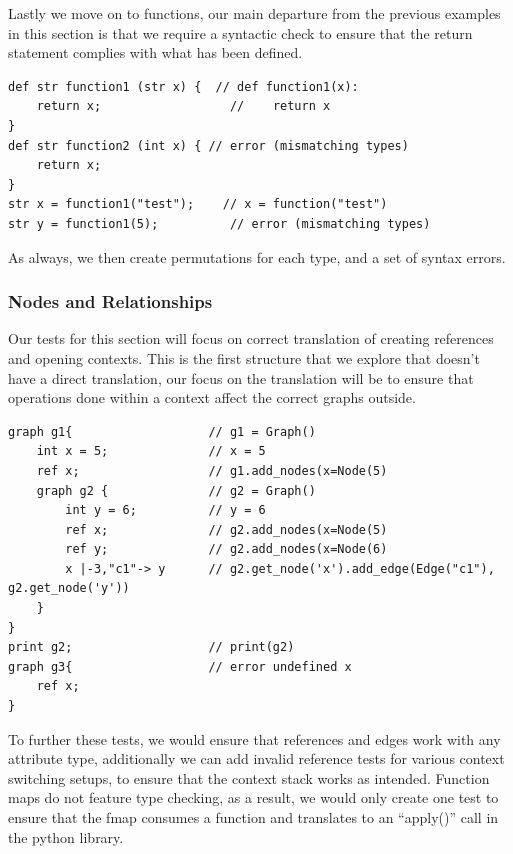 Lastly we move on to functions, our main departure from the previous examples in this section is that we require a
syntactic check to ensure that the return statement complies with what has been defined.

\begin{lstlisting}[caption={Testing functions},captionpos=b, label={lst:lattice-function-test}]
def str function1 (str x) {  // def function1(x):
    return x;                  //    return x
}
def str function2 (int x) { // error (mismatching types)
    return x;
}
str x = function1("test");    // x = function("test")
str y = function1(5);          // error (mismatching types)
\end{lstlisting}

As always, we then create permutations for each type, and a set of syntax errors.

\subsubsection{Nodes and Relationships}
Our tests for this section will focus on correct translation of creating references and opening contexts.
This is the first structure that we explore that doesn't have a direct translation, our focus on the translation will
be to ensure that operations done within a context affect the correct graphs outside.

\begin{lstlisting}[caption={Testing graphs},captionpos=b, label={lst:lattice-graph-test}]
graph g1{                   // g1 = Graph()
    int x = 5;              // x = 5
    ref x;                  // g1.add_nodes(x=Node(5)
    graph g2 {              // g2 = Graph()
        int y = 6;          // y = 6
        ref x;              // g2.add_nodes(x=Node(5)
        ref y;              // g2.add_nodes(x=Node(6)
        x |-3,"c1"-> y      // g2.get_node('x').add_edge(Edge("c1"), g2.get_node('y'))
    }
}
print g2;                   // print(g2)
graph g3{                   // error undefined x
    ref x;
}
\end{lstlisting}

To further these tests, we would ensure that references and edges work with any attribute type, additionally we can
add invalid reference tests for various context switching setups, to ensure that the context stack works as intended.
Function maps do not feature type checking, as a result, we would only create one test to ensure that the fmap consumes
a function and translates to an ``apply()'' call in the python library.

